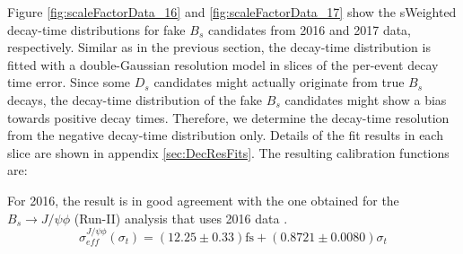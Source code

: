Figure \ref{fig:scaleFactorData_16} and \ref{fig:scaleFactorData_17} show the \textsf{sWeighted} decay-time distributions for fake $B_s$ candidates from 2016 and 2017 data, respectively.
Similar as in the previous section, the decay-time distribution is fitted with a double-Gaussian resolution model in slices of the per-event decay time error.
Since some $D_s$ candidates might actually originate from true $B_s$ decays, the decay-time distribution of the fake $B_s$ candidates 
might show a bias towards positive decay times. 
Therefore, we determine the decay-time resolution from the negative decay-time distribution only.
Details of the fit results in each slice are shown in appendix \ref{sec:DecResFits}. 
The resulting calibration functions are:


For 2016, the result is in good agreement with the one obtained for the $B_s \to J/\psi \phi$ (Run-II) analysis that uses 2016 data \cite{LHCb-ANA-2017-028}. 
\begin{equation}
\sigma_{eff}^{J/\psi\phi}(\sigma_t) = \left( 12.25 \pm 0.33 \right) \text{fs} + \left( 0.8721 \pm 0.0080 \right) \sigma_t
\label{eq:scaleFactorJpsiPhi}
\end{equation}

